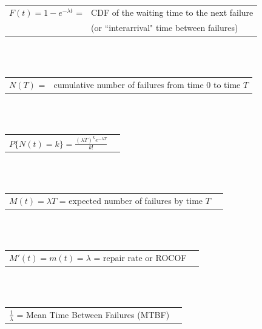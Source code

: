 \documentclass[12pt]{article}
\begin{document}
\pagestyle{empty}
\Large
{}
\pagecolor{ehandbook}

\bf
\boldmath

\begin{tabular}{ll}
\hspace*{-.3in}
$ F(t) = 1 - e^{-\lambda t}$ = & CDF of the waiting time to the next failure \\
                                           & (or ``interarrival" time between failures)
\end{tabular}
\\
\\
\begin{tabular}{ll}
$N(T)$ = & cumulative number of failures from time 0 to time $T$ 
\end{tabular}
\\
\\          
 \begin{tabular}{ll}    
$\displaystyle{P\{N(t)=k\} = \frac{(\lambda T)^k e^{-\lambda T}}{k!}}$  \\
\end{tabular}
\\
\\
\begin{tabular}{ll}
$M(t) = \lambda T$ = expected number of failures by time $T$ \\
\end{tabular}
\\
\\
\begin{tabular}{ll}                    
$M'(t) = m(t) = \lambda$ = repair rate or ROCOF \\
\end{tabular}
\\
\\
\begin{tabular}{ll}
$\displaystyle{\frac{1}{\lambda}}$ = Mean Time Between Failures (MTBF) 
\end{tabular}
 
  
\end{document}
